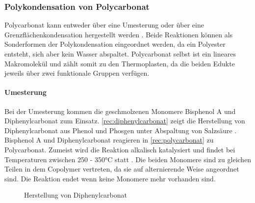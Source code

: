 \subsubsection{Polykondensation von Polycarbonat}

Polycarbonat kann entweder über eine Umesterung oder über eine
Grenzflächenkondensation hergestellt werden \cite{cuzpe}. Beide Reaktionen
können als Sonderformen der Polykondensation eingeordnet werden, da ein
Polyester entsteht, sich aber kein Wasser abspaltet. Polycarbonat selbst ist ein
lineares Makromolekül und zählt somit zu den Thermoplasten, da die beiden Edukte
jeweils über zwei funktionale Gruppen verfügen.

\paragraph{Umesterung} Bei der Umesterung kommen die geschmolzenen Monomere
Bisphenol A und Diphenylcarbonat zum Einsatz. \autoref{rec:diphenylcarbonat}
zeigt die Herstellung von Diphenylcarbonat aus Phenol und Phosgen unter
Abspaltung von Salzsäure \cite{cuzpe}. Bisphenol A und Diphenylcarbonat
reagieren in \autoref{rec:polycarbonat} zu Polycarbonat. Zumeist wird die
Reaktion alkalisch katalysiert und findet bei Temperaturen zwischen 250 - 350°C
statt \cite{pop}. Die beiden Monomere sind zu gleichen Teilen in dem Copolymer
vertreten, da sie auf alternierende Weise angeordnet sind. Die Reaktion endet
wenn keine Monomere mehr vorhanden sind.

\begin{figure}[H]
    \begin{center}
        \footnotesize
        \setatomsep{1.7em}

        \chemsign{+}
        \chemrel{->}
        \chemsign{+}

        \caption{Herstellung von Diphenylcarbonat}
        \label{rec:diphenylcarbonat}
    \end{center}
\end{figure}

